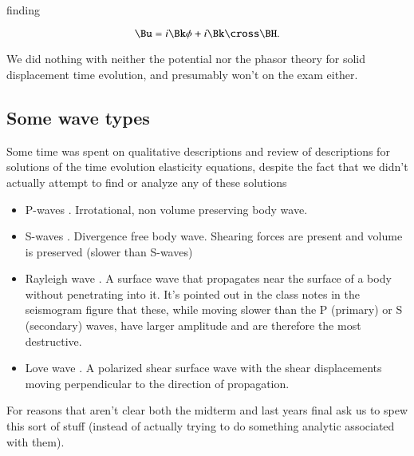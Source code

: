finding

\begin{equation}\label{eqn:continuumElasticityReview:810}
\Bu = i \Bk \phi + i \Bk \cross \BH.
\end{equation}

We did nothing with neither the potential nor the phasor theory for solid displacement time evolution, and presumably won't on the exam either.

\subsection{Some wave types}

Some time was spent on qualitative descriptions and review of descriptions for solutions of the time evolution elasticity equations, despite the fact that we didn't actually attempt to find or analyze any of these solutions

\begin{itemize}
\item P-waves \cite{wiki:pwave}.  Irrotational, non volume preserving body wave.
\item S-waves \cite{wiki:swave}.  Divergence free body wave.  Shearing forces are present and volume is preserved (slower than S-waves)
\item Rayleigh wave \cite{wiki:rayleighwave}.  A surface wave that propagates near the surface of a body without penetrating into it.  It's pointed out in the class notes in the seismogram figure that these, while moving slower than the P (primary) or S (secondary) waves, have larger amplitude and are therefore the most destructive.
\item Love wave \cite{wiki:lovewave}.  A polarized shear surface wave with the shear displacements moving perpendicular to the direction of propagation.
\end{itemize}

For reasons that aren't clear both the midterm and last years final ask us to spew this sort of stuff (instead of actually trying to do something analytic associated with them).
